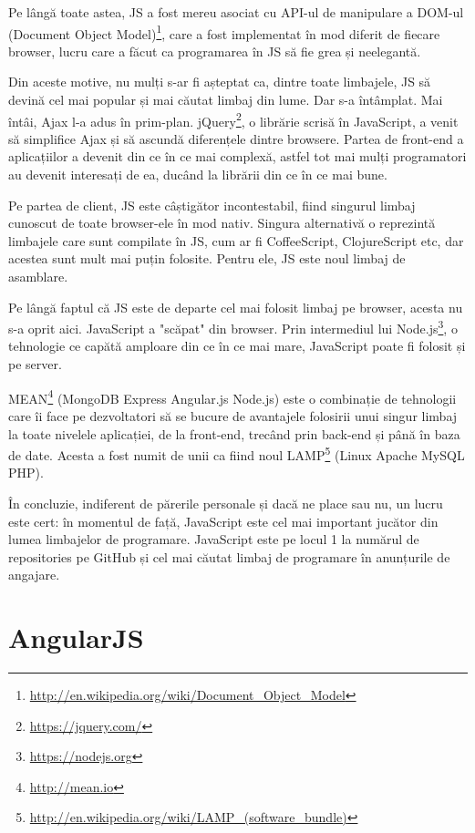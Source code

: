 Pe lângă toate astea, JS a fost mereu asociat cu API-ul de manipulare a DOM-ul 
(Document Object Model)\footnote{\url{http://en.wikipedia.org/wiki/Document\_Object\_Model}},
care a fost implementat în mod diferit
de fiecare browser, lucru care a făcut ca programarea în JS să fie
grea și neelegantă.

Din aceste motive, nu mulți s-ar fi așteptat ca, dintre toate
limbajele, JS să devină cel mai popular și mai căutat limbaj din
lume. Dar s-a întâmplat. Mai întâi, Ajax l-a adus în prim-plan.
jQuery\footnote{\url{https://jquery.com/}}, o librărie scrisă în JavaScript, a venit să simplifice 
Ajax și să ascundă diferențele dintre
browsere. Partea de front-end a aplicațiilor a devenit din ce
în ce mai complexă, astfel tot mai mulți programatori au
devenit interesați de ea, ducând la librării din ce în ce mai bune.

Pe partea de client, JS este câștigător incontestabil, fiind
singurul limbaj cunoscut de toate browser-ele în mod nativ.
Singura alternativă o reprezintă limbajele care sunt compilate
în JS, cum ar fi CoffeeScript, ClojureScript etc, dar acestea
sunt mult mai puțin folosite. Pentru ele, JS este
noul limbaj de asamblare.

Pe lângă faptul că JS este de departe cel mai folosit limbaj
pe browser, acesta nu s-a oprit aici. JavaScript a "scăpat" din browser.
Prin intermediul lui Node.js\footnote{\url{https://nodejs.org}}, 
o tehnologie ce capătă amploare 
din ce în ce mai mare, JavaScript poate fi folosit
și pe server. 

MEAN\footnote{\url{http://mean.io}} (MongoDB Express Angular.js Node.js) 
este o combinație de tehnologii
care îi face pe dezvoltatori să se bucure de avantajele folosirii
unui singur limbaj la toate nivelele aplicației, de la front-end,
trecând prin back-end și până în baza de date. Acesta a fost numit
de unii ca fiind noul 
LAMP\footnote{\url{http://en.wikipedia.org/wiki/LAMP\_(software\_bundle)}}
(Linux Apache MySQL PHP).

În concluzie, indiferent de părerile personale și dacă ne place
sau nu, un lucru este cert: în momentul de față, JavaScript
este cel mai important jucător din lumea limbajelor
de programare. JavaScript este pe locul 1 la numărul de
repositories pe GitHub și cel mai căutat limbaj de programare
în anunțurile de angajare.

\section{AngularJS}

